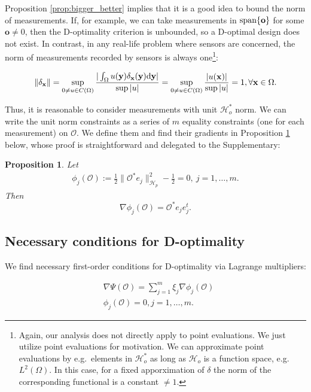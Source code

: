 \documentclass[ba]{imsart}
\newcommand{\der}{\text{\textup{d}}}
\providecommand{\x}{}
\renewcommand{\x}{\mathbf{x}}
\newcommand{\y}{\mathbf{y}}
\newcommand{\hilp}{\mathcal{H}_p}
\newcommand{\hilo}{\mathcal{H}_o}
\newcommand{\obs}{\mathcal{O}}
\newcommand{\tar}{\Psi}
\newcommand{\meas}{\mathbf{o}}
\theoremstyle{plain}
\newtheorem{proposition}[theorem]{Proposition}
\theoremstyle{definition}
\theoremstyle{remark}
\begin{document}
Proposition \ref{prop:bigger_better} implies that it is a good idea to
bound the norm of measurements. If, for example, we can take
measurements in $\textup{span}\{\meas\}$ for some $\meas \neq 0$, then
the D-optimality criterion is unbounded, so a D-optimal design does
not exist. In contrast, in any real-life problem where sensors are
concerned, the norm of measurements recorded by sensors is always
one\footnote{Again, our analysis does not directly apply to point
evaluations. We just utilize point evaluations for motivation. We can
approximate point evaluations by e.g.~elements in $\hilo^*$ as long as
$\hilo$ is a function space, e.g.~$L^2(\Omega)$. In this case, for a
fixed apporximation of $\delta$ the norm of the corresponding
functional is a constant $\neq 1$.}:

\begin{equation}
  \| \delta_{\x} \| = \sup_{0 \neq u \in C(\Omega)}
  \frac{
    |\int_{\Omega}u(\y) \delta_{\x}(\y) \der \y|
  }{
    \sup|u|
  } = \sup_{0 \neq u \in C(\Omega)} \frac{|u(\x)|}{\sup|u|} = 1,
  \forall \x \in \Omega.
\end{equation}

Thus, it is reasonable to consider measurements with unit $\hilo^*$
norm. We can write the unit norm constraints as a series of $m$
equality constraints (one for each measurement) on $\obs$. We define
them and find their gradients in Proposition
\ref{prop:constraints_grad} below, whose proof is straightforward and
delegated to the Supplementary:

\begin{proposition}\label{prop:constraints_grad}
  Let
  \begin{align*}
    \phi_j(\obs) :=\frac12 \| \obs^* e_j\|_{\hilp}^2 - \frac12 = 0,\ j=1,\dots,m.
  \end{align*}
  Then
  \begin{equation*}
\nabla \phi_j(\obs) = \obs^* e_je_j^t.
  \end{equation*}
\end{proposition}







\subsection{Necessary conditions for D-optimality}
We find necessary first-order conditions for D-optimality via Lagrange
multipliers:

\begin{align}
  &\nabla \tar(\obs) = \sum_{j=1}^m \xi_j \nabla \phi_j (\obs)
  \label{eq:Lagrange_mult1} \\
    &\phi_j(\obs) = 0, j = 1,\dots,m. \label{eq:Lagrange_mult2}
\end{align}
\end{document}
